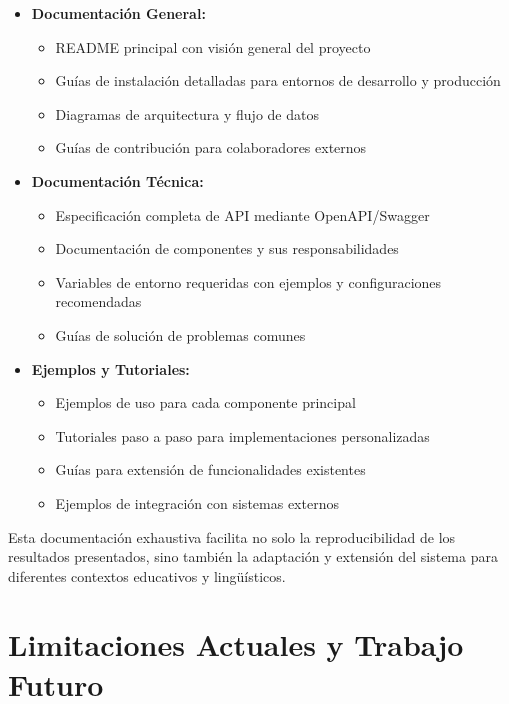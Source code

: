 \begin{itemize}
    \item \textbf{Documentación General:}
    \begin{itemize}
        \item README principal con visión general del proyecto
        \item Guías de instalación detalladas para entornos de desarrollo y producción
        \item Diagramas de arquitectura y flujo de datos
        \item Guías de contribución para colaboradores externos
    \end{itemize}
    
    \item \textbf{Documentación Técnica:}
    \begin{itemize}
        \item Especificación completa de API mediante OpenAPI/Swagger
        \item Documentación de componentes y sus responsabilidades
        \item Variables de entorno requeridas con ejemplos y configuraciones recomendadas
        \item Guías de solución de problemas comunes
    \end{itemize}
    
    \item \textbf{Ejemplos y Tutoriales:}
    \begin{itemize}
        \item Ejemplos de uso para cada componente principal
        \item Tutoriales paso a paso para implementaciones personalizadas
        \item Guías para extensión de funcionalidades existentes
        \item Ejemplos de integración con sistemas externos
    \end{itemize}
\end{itemize}

Esta documentación exhaustiva facilita no solo la reproducibilidad de los resultados presentados, sino también la adaptación y extensión del sistema para diferentes contextos educativos y lingüísticos.

\section{Limitaciones Actuales y Trabajo Futuro}
\label{sec:limitaciones-trabajo-futuro}

